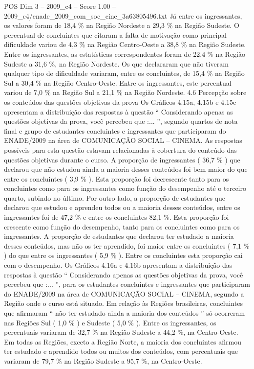\begin{textsample}{POS Dim 3 – 2009\_c4 – Score 1.00 – 2009\_c4/enade\_2009\_com\_soc\_cine\_3a63805496.txt}
Já entre os ingressantes, os valores foram de 18,4 \% na Região Nordeste a 29,3 \% na Região Sudeste.
O percentual de concluintes que citaram a falta de motivação como principal dificuldade variou de 4,3 \% na Região Centro-Oeste a 38,8 \% na Região Sudeste.
Entre os ingressantes, as estatísticas correspondentes foram de 22,4 \% na Região Sudeste a 31,6 \%, na Região Nordeste.
Os que declararam que não tiveram qualquer tipo de dificuldade variaram, entre os concluintes, de 15,4 \% na Região Sul a 30,4 \% na Região Centro-Oeste.
Entre os ingressantes, este percentual variou de 7,0 \% na Região Sul a 21,1 \% na Região Nordeste. 4.6 Percepção sobre os conteúdos das questões objetivas da prova Os Gráficos 4.15a, 4.15b e 4.15c apresentam a distribuição das respostas à questão “ Considerando apenas as questões objetivas da prova, você percebeu que :... ”, segundo quartos de nota final e grupo de estudantes concluintes e ingressantes que participaram do ENADE/2009 na área de COMUNICAÇÃO SOCIAL – CINEMA.
As respostas possíveis para esta questão estavam relacionadas à cobertura do conteúdo das questões objetivas durante o curso.
A proporção de ingressantes ( 36,7 \% ) que declarou que não estudou ainda a maioria desses conteúdos foi bem maior do que entre os concluintes ( 3,9 \% ).
Esta proporção foi decrescente tanto para os concluintes como para os ingressantes como função do desempenho até o terceiro quarto, subindo no último.
Por outro lado, a proporção de estudantes que declarou que estudou e aprendeu todos ou a maioria desses conteúdos, entre os ingressantes foi de 47,2 \% e entre os concluintes 82,1 \%.
Esta proporção foi crescente como função do desempenho, tanto para os concluintes como para os ingressantes.
A proporção de estudantes que declarou ter estudado a maioria desses conteúdos, mas não os ter aprendido, foi maior entre os concluintes ( 7,1 \% ) do que entre os ingressantes ( 5,9 \% ).
Entre os concluintes esta proporção cai com o desempenho.
Os Gráficos 4.16a e 4.16b apresentam a distribuição das respostas à questão “ Considerando apenas as questões objetivas da prova, você percebeu que :... ”, para os estudantes concluintes e ingressantes que participaram do ENADE/2009 na área de COMUNICAÇÃO SOCIAL – CINEMA, segundo a Região onde o curso está situado.
Em relação às Regiões brasileiras, concluintes que afirmaram “ não ter estudado ainda a maioria dos conteúdos ” só ocorreram nas Regiões Sul ( 1,0 \% ) e Sudeste ( 5,0 \% ).
Entre os ingressantes, os percentuais variaram de 32,7 \% na Região Sudeste a 44,2 \%, na Centro-Oeste.
Em todas as Regiões, exceto a Região Norte, a maioria dos concluintes afirmou ter estudado e aprendido todos ou muitos dos conteúdos, com percentuais que variaram de 79,7 \% na Região Sudeste a 95,7 \%, na Centro-Oeste.

\end{textsample}
